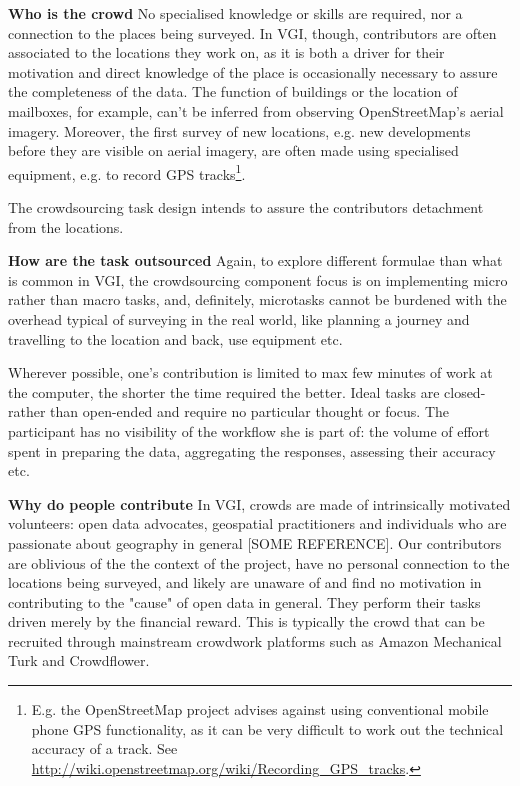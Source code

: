 \textbf{Who is the crowd} No specialised knowledge or skills are required, nor a connection to the places being surveyed. In VGI, though, contributors are often associated to the locations they work on, as it is both a driver for their motivation and direct knowledge of the place is occasionally necessary to assure the completeness of the data. The function of buildings or the location of mailboxes, for example, can't be inferred from observing OpenStreetMap's aerial imagery. Moreover, the first survey of new locations, e.g. new developments before they are visible on aerial imagery, are often made using specialised equipment, e.g. to record GPS tracks\footnote{E.g. the OpenStreetMap project advises against using conventional mobile phone GPS functionality, as it can be very difficult to work out the technical accuracy of a track. See \url{http://wiki.openstreetmap.org/wiki/Recording_GPS_tracks}.}.

The crowdsourcing task design intends to assure the contributors detachment from the locations.

\textbf{How are the task outsourced} Again, to explore different formulae than what is common in VGI, the crowdsourcing component focus is on implementing micro rather than macro tasks, and, definitely, microtasks cannot be burdened with the overhead typical of surveying in the real world, like planning a journey and travelling to the location and back, use equipment etc. 

Wherever possible, one's contribution is limited to max few minutes of work at the computer, the shorter the time required the better. Ideal tasks are closed- rather than open-ended and require no particular thought or focus. The participant has no visibility of the workflow she is part of: the volume of effort spent in preparing the data, aggregating the responses, assessing their accuracy etc. 

\textbf{Why do people contribute} In VGI, crowds are made of intrinsically motivated volunteers: open data advocates, geospatial practitioners and individuals who are passionate about geography in general [SOME REFERENCE]. Our contributors are oblivious of the the context of the project, have no personal connection to the locations being surveyed, and likely are unaware of and find no motivation in contributing to the "cause" of open data in general. They perform their tasks driven merely by the financial reward. This is typically the crowd that can be recruited through mainstream crowdwork platforms such as Amazon Mechanical Turk and Crowdflower. 

